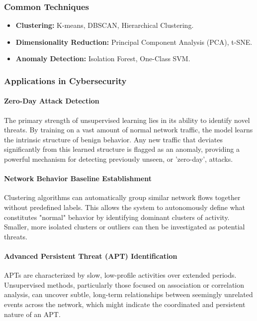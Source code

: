 \documentclass[12pt]{report}
\begin{document}
\subsubsection{Common Techniques}
\begin{itemize}
    \item \textbf{Clustering:} K-means, DBSCAN, Hierarchical Clustering.
    \item \textbf{Dimensionality Reduction:} Principal Component Analysis (PCA), t-SNE.
    \item \textbf{Anomaly Detection:} Isolation Forest, One-Class SVM.
\end{itemize}

\subsubsection{Applications in Cybersecurity}
\paragraph{Zero-Day Attack Detection}
The primary strength of unsupervised learning lies in its ability to identify novel threats. By training on a vast amount of normal network traffic, the model learns the intrinsic structure of benign behavior. Any new traffic that deviates significantly from this learned structure is flagged as an anomaly, providing a powerful mechanism for detecting previously unseen, or 'zero-day', attacks.

\paragraph{Network Behavior Baseline Establishment}
Clustering algorithms can automatically group similar network flows together without predefined labels. This allows the system to autonomously define what constitutes "normal" behavior by identifying dominant clusters of activity. Smaller, more isolated clusters or outliers can then be investigated as potential threats.

\paragraph{Advanced Persistent Threat (APT) Identification}
APTs are characterized by slow, low-profile activities over extended periods. Unsupervised methods, particularly those focused on association or correlation analysis, can uncover subtle, long-term relationships between seemingly unrelated events across the network, which might indicate the coordinated and persistent nature of an APT.
\end{document}
